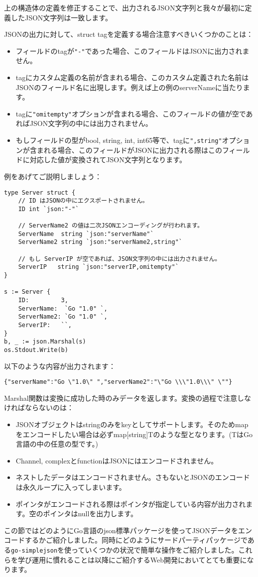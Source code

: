 上の構造体の定義を修正することで、出力されるJSON文字列と我々が最初に定義したJSON文字列は一致します。

JSONの出力に対して、struct tagを定義する場合注意すべきいくつかのことは：

\begin{itemize}
  \item フィールドのtagが\texttt{"-"}であった場合、このフィールドはJSONに出力されません。
  \item tagにカスタム定義の名前が含まれる場合、このカスタム定義された名前はJSONのフィールド名に出現します。例えば上の例のserverNameに当たります。
  \item tagに\texttt{"omitempty"}オプションが含まれる場合、このフィールドの値が空であればJSON文字列の中には出力されません。
  \item もしフィールドの型がbool, string, int, int65等で、tagに\texttt{",string"}オプションが含まれる場合、このフィールドがJSONに出力される際はこのフィールドに対応した値が変換されてJSON文字列となります。
\end{itemize}

例をあげてご説明しましょう：

\begin{lstlisting}[numbers=none]
type Server struct {
    // ID はJSONの中にエクスポートされません。
    ID int `json:"-"`

    // ServerName2 の値は二次JSONエンコーディングが行われます。
    ServerName  string `json:"serverName"`
    ServerName2 string `json:"serverName2,string"`

    // もし ServerIP が空であれば、JSON文字列の中には出力されません。
    ServerIP   string `json:"serverIP,omitempty"`
}

s := Server {
    ID:         3,
    ServerName:  `Go "1.0" `,
    ServerName2: `Go "1.0" `,
    ServerIP:   ``,
}
b, _ := json.Marshal(s)
os.Stdout.Write(b)
\end{lstlisting}

以下のような内容が出力されます：

\begin{lstlisting}[numbers=none]
{"serverName":"Go \"1.0\" ","serverName2":"\"Go \\\"1.0\\\" \""}
\end{lstlisting}

Marshal関数は変換に成功した時のみデータを返します。変換の過程で注意しなければならないのは：

\begin{itemize}
  \item JSONオブジェクトはstringのみをkeyとしてサポートします。そのためmapをエンコードしたい場合は必ずmap[string]Tのような型となります。(TはGo言語の中の任意の型です。)
  \item Channel, complexとfunctionはJSONにはエンコードされません。
  \item ネストしたデータはエンコードされません。さもないとJSONのエンコードは永久ループに入ってしまいます。
  \item ポインタがエンコードされる際はポインタが指定している内容が出力されます。空のポインタはnullを出力します。
\end{itemize}

この節ではどのようにGo言語のjson標準パッケージを使ってJSONデータをエンコードするかご紹介しました。同時にどのようにサードパーティパッケージである\texttt{go-simplejson}を使っていくつかの状況で簡単な操作をご紹介しました。これらを学び運用に慣れることは以降にご紹介するWeb開発においてとても重要になります。



